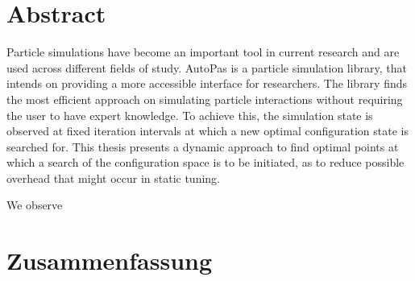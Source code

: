 \thispagestyle{plain}

\chapter*{Abstract}

Particle simulations have become an important tool in current research and are used across different fields of study. AutoPas is a particle simulation library, that intends on providing a more accessible interface for researchers. The library finds the most efficient approach on simulating particle interactions without requiring the user to have expert knowledge. To achieve this, the simulation state is observed at fixed iteration intervals at which a new optimal configuration state is searched for. This thesis presents a dynamic approach to find optimal points at which a search of the configuration space is to be initiated, as to reduce possible overhead that might occur in static tuning.

We observe \textellipsis



\MediaOptionLogicBlank

\chapter*{Zusammenfassung}



\MediaOptionLogicBlank